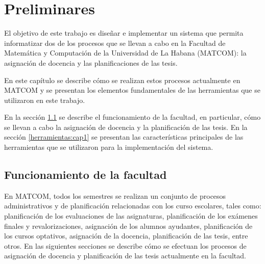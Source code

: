\chapter{Preliminares}\label{chapter:preliminaries}
El objetivo de este trabajo es diseñar e implementar un sistema que 
permita informatizar dos de los procesos que se llevan a cabo en la Facultad
de Matemática y Computación de la Universidad de La Habana (MATCOM): 
la asignación de docencia y las planificaciones de las tesis.

En este capítulo se describe cómo se realizan estos procesos actualmente 
en MATCOM y se presentan los elementos fundamentales de las herramientas que se utilizaron 
en este trabajo.

En la sección \ref{section:funcionamiento de la facultad} se describe 
el funcionamiento de la facultad, en particular, cómo se llevan a cabo la 
asignación de docencia y la planificación de las tesis. En la sección 
\ref{herramientas:cap1} se presentan las características principales de las 
herramientas que se utilizaron para la implementación del sistema.





\section{Funcionamiento de la facultad}\label{section:funcionamiento de la facultad}
En MATCOM, todos los semestres se realizan 
un conjunto de procesos administrativos y de planificación relacionadas con
los curso escolares, tales como: planificación 
de los evaluaciones de las asignaturas, planificación de los exámenes finales y 
revalorizaciones, asignación de los alumnos ayudantes, planificación de los cursos 
optativos, asignación de la docencia, planificación de las tesis, entre otros. 
En las siguientes secciones se describe cómo se efectuan
los procesos de asignación de docencia y planificación de las tesis
actualmente en la facultad.




